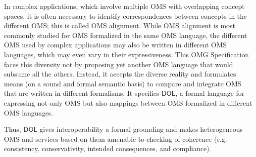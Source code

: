 \documentclass[10pt,fleqn,final]{scrreprt}
\makeatletter
\newcommand*{\eg}{e.g.\@\xspace}
\newcommand*\CommentAuthor{}
\renewcommand*\CommentAuthor{#1}}
\newcommand*\CommentDate{}
\renewcommand*\CommentDate{#1}}
\newcommand*\CommentId{}
\renewcommand*\CommentId{#1}}
\newcommand*\CommentType{}
\renewcommand*\CommentType{#1}}
\newcommand*{\SetCommentColorByType}[1]{%
\edef\localType{{#1}}%
\expandafter\ifstrequal\localType{q-aut}{\colorlet{CommentColor}{red}}{%
\expandafter\ifstrequal\localType{q-all}{\colorlet{CommentColor}{orange}}{%
\expandafter\ifstrequal\localType{todo}{\colorlet{CommentColor}{orange}}{%
\expandafter\ifstrequal\localType{fyi}{\colorlet{CommentColor}{lightgray}}{%
\colorlet{CommentColor}{yellow}}}}}}
\newcommand*{\SetCommentPrefixByType}[1]{%
\edef\localType{{#1}}%
\expandafter\@ifmtarg\localType{%
\edef\CommentPrefix{}%
}{%
\caseupper[q]{#1}%
\edef\CommentPrefix{\thestring: }%
}}
\newcommand*{\initComment}[1]{%
\setkeys{Comment}{#1}%
\SetCommentColorByType{\CommentType}%
\relax%
\SetCommentPrefixByType{\CommentType}%
\relax%
}
\newcommand*{\todonote}[2][]{%
\initComment{#1}%
\pdfcomment[author=\CommentAuthor,color=CommentColor,date=\CommentDate,id=\CommentId]{%
\CommentPrefix
#2}}
\renewcommand*{\todonote}[2][]{%
\initComment{#1}%
\ednote{\CommentPrefix #2}}
\newcommand*{\IS}{OMG Specification\xspace}
\newcommand*{\DOL}{\ensuremath{\mathsf{DOL}}\xspace}
\makeatother
\begin{document}
In complex applications, which involve multiple OMS with overlapping concept spaces,
it is often necessary to identify correspondences between concepts in the different OMS; this is called  OMS alignment. 
While OMS alignment is most commonly studied for OMS formalized in the same OMS 
language, the different OMS used by complex applications may also be written in different 
OMS languages, which may even vary in their expressiveness. 
This \IS faces this diversity not by proposing yet another OMS language that would subsume all the others.  
Instead, it accepts the diverse reality and formulates means (on a sound and formal semantic basis) 
to compare and integrate OMS that are written in different formalisms.
It specifies \DOL, a formal language for
expressing not only OMS but also mappings between OMS formalized in different OMS languages.

Thus, \DOL gives interoperability a formal grounding and makes heterogeneous OMS and services based
on them amenable to checking of coherence (\eg consistency, conservativity, intended consequences,
and compliance).

\end{document}
